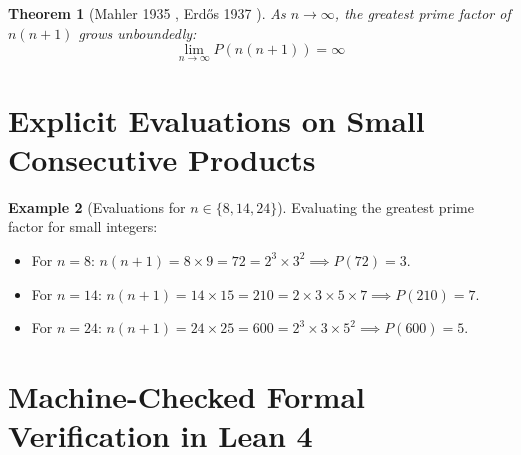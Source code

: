 \documentclass[11pt,a4paper]{article}
\newtheorem{theorem}{Theorem}[section]
\theoremstyle{definition}
\newtheorem{example}[theorem]{Example}
\begin{document}
\begin{theorem}[Mahler 1935 \cite{mahler1935}, Erd\H{o}s 1937 \cite{erdos1937}]\label{thm:mahler_erdos}
As $n \to \infty$, the greatest prime factor of $n(n+1)$ grows unboundedly:
\begin{equation}\label{eq:mahler_limit}
\lim_{n \to \infty} P(n(n+1)) = \infty
\end{equation}
\end{theorem}

\section{Explicit Evaluations on Small Consecutive Products}

\begin{example}[Evaluations for $n \in \{8, 14, 24\}$]\label{ex:consec_prime_evals}
Evaluating the greatest prime factor for small integers:
\begin{itemize}
    \item For $n = 8$: $n(n+1) = 8 \times 9 = 72 = 2^3 \times 3^2 \implies P(72) = 3$.
    \item For $n = 14$: $n(n+1) = 14 \times 15 = 210 = 2 \times 3 \times 5 \times 7 \implies P(210) = 7$.
    \item For $n = 24$: $n(n+1) = 24 \times 25 = 600 = 2^3 \times 3 \times 5^2 \implies P(600) = 5$.
\end{itemize}
\end{example}

\section{Machine-Checked Formal Verification in Lean 4}
\end{document}
